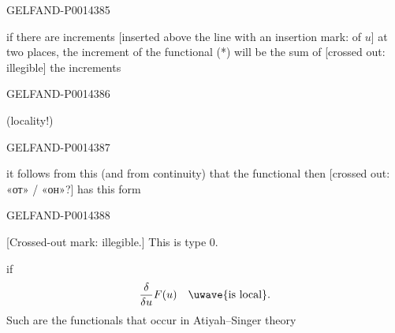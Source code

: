 \begin{GelfandAdjacentEvidence}{GELFAND-P001438}{5}


if there are increments [inserted above the line with an insertion mark: of \(u\)] at two places, the increment of the functional (*) will be the sum of [crossed out: illegible] the increments
\end{GelfandAdjacentEvidence}
\begin{GelfandAdjacentEvidence}{GELFAND-P001438}{6}


(locality!)

\end{GelfandAdjacentEvidence}
\begin{GelfandAdjacentEvidence}{GELFAND-P001438}{7}

it follows from this (and from continuity) that the functional then [crossed out: «от» / «он»?] has this form
\end{GelfandAdjacentEvidence}
\begin{GelfandAdjacentEvidence}{GELFAND-P001438}{8}


[Crossed-out mark: illegible.] This is type 0.
\end{GelfandAdjacentEvidence}



 if
\[
\frac{\delta}{\delta u}F(u)\quad\text{\uwave{is local}.}
\]
Such are the functionals that occur in Atiyah–Singer theory

